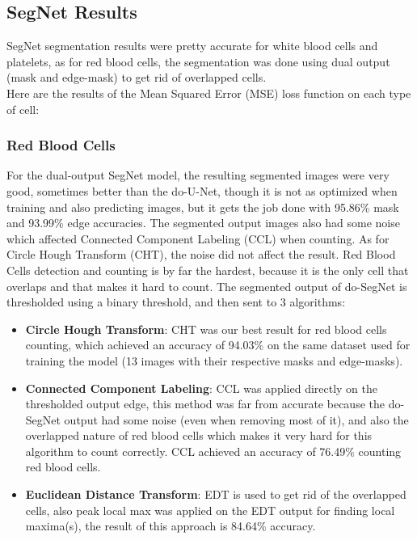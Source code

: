\documentclass[conference]{IEEEtran}
\begin{document}
\subsection{SegNet Results}
\hspace{\parindent}
SegNet segmentation results were pretty accurate for white blood cells and platelets, as for red blood cells, the segmentation was done using dual output (mask and edge-mask) to get rid of overlapped cells.\\
Here are the results of the Mean Squared Error (MSE) loss function on each type of cell:

\subsubsection{Red Blood Cells}
\hspace{\parindent}
For the dual-output SegNet model, the resulting segmented images were very good, sometimes better than the do-U-Net, though it is not as optimized when training and also predicting images, but it gets the job done with 95.86\% mask and 93.99\% edge accuracies. The segmented output images also had some noise which affected Connected Component Labeling (CCL) when counting.
As for Circle Hough Transform (CHT), the noise did not affect the result.
Red Blood Cells detection and counting is by far the hardest, because it is the only cell that overlaps and that makes it hard to count.
The segmented output of do-SegNet is thresholded using a binary threshold, and then sent to 3 algorithms:

\begin{itemize}
  \item \textbf{Circle Hough Transform}: CHT was our best result for red blood cells counting, which achieved an accuracy of 94.03\% on the same dataset used for training the model (13 images with their respective masks and edge-masks).
  \item \textbf{Connected Component Labeling}: CCL was applied directly on the thresholded output edge, this method was far from accurate because the do-SegNet output had some noise (even when removing most of it), and also the overlapped nature of red blood cells which makes it very hard for this algorithm to count correctly. CCL achieved an accuracy of 76.49\% counting red blood cells.
  \item \textbf{Euclidean Distance Transform}: EDT is used to get rid of the overlapped cells, also peak local max was applied on the EDT output for finding local maxima(s), the result of this approach is 84.64\% accuracy.
\end{itemize}
\end{document}

